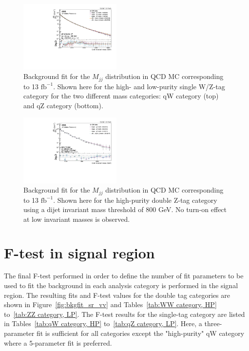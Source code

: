 \begin{figure}[h!]
\includegraphics[width=0.45\textwidth]{figures/analysis/search2/AN-16-235/plots/qZLP_fitComp.pdf}
\caption{Background fit for the $M_{jj}$ distribution in QCD MC corresponding to 13 $\textrm{fb}^{-1}$. Shown here for the high- and low-purity single W/Z-tag category for the two different mass categories: qW category (top) and qZ category (bottom).}
\label{fig:bkgfitQCD_qV}
\end{figure}

\begin{figure}[h!]
\centering
\includegraphics[width=0.45\textwidth]{figures/analysis/search2/AN-16-235/plots/ZZHP_fitComp_mjj800.pdf}
\caption{Background fit for the $M_{jj}$ distribution in QCD MC corresponding to 13 $\textrm{fb}^{-1}$. Shown here for the high-purity double Z-tag category using a dijet invariant mass threshold of 800 GeV. No turn-on effect at low invariant masses is observed.}
\label{fig:bkgfitQCD_ZZHP}
\end{figure}


% 
\clearpage
\section{F-test in signal region}
\label{sec:app:2016:ftest}

The final F-test performed in order to define the number of fit parameters to be used to fit the background in each analysis category is performed in the signal region. The resulting fits and F-test values for the double tag categories are shown in Figure~\ref{fig:bkgfit_sr_vv} and Tables~\ref{tab:WW category, HP} to~\ref{tab:ZZ category, LP}. The F-test results for the single-tag category are listed in Tables~\ref{tab:qW category, HP} to~\ref{tab:qZ category, LP}. Here, a three-parameter fit is sufficient for all categories except the "high-purity" qW category where a 5-parameter fit is preferred.


